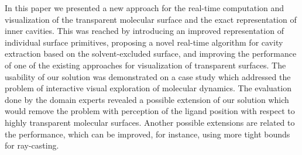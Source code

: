 In this paper we presented a new approach for the real-time computation and visualization of the transparent molecular surface and the exact representation of inner cavities. 
This was reached by introducing an improved representation of individual surface primitives, proposing a novel real-time algorithm for cavity extraction based on the solvent-excluded surface, and improving the performance of one of the existing approaches for visualization of transparent surfaces.
The usability of our solution was demonstrated on a case study which addressed the problem of interactive visual exploration of molecular dynamics.
The evaluation done by the domain experts revealed a possible extension of our solution which would remove the problem with perception of the ligand position with respect to highly transparent molecular surfaces.
Another possible extensions are related to the performance, which can be improved, for instance, using more tight bounds for ray-casting.
